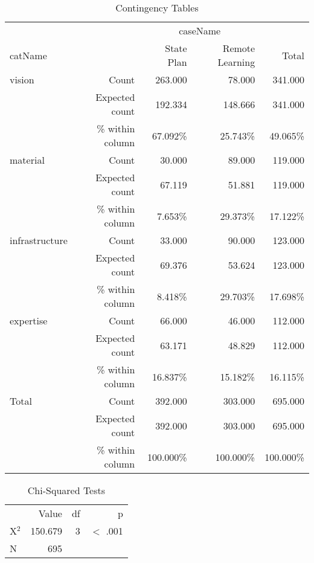 \documentclass[6pt, oneside]{article}   	%
\begin{document}


\begin{table}[h]
	\centering
	\caption{Contingency Tables}
	\label{tab:contingencyTables}
	{
		\begin{tabular}{lrrrr}
			\toprule
			\multicolumn{1}{c}{} & \multicolumn{1}{c}{} & \multicolumn{2}{c}{caseName} & \multicolumn{1}{c}{} \\
			\cline{3-4}
			catName &  & State Plan & Remote Learning & Total  \\
			\cmidrule[0.4pt]{1-5}
			vision & Count & 263.000 & 78.000 & 341.000  \\
			 & Expected count & 192.334 & 148.666 & 341.000  \\
			 &  \% within column & 67.092\% & 25.743\% & 49.065\%  \\
			material & Count & 30.000 & 89.000 & 119.000  \\
			 & Expected count & 67.119 & 51.881 & 119.000  \\
			 &  \% within column & 7.653\% & 29.373\% & 17.122\%  \\
			infrastructure & Count & 33.000 & 90.000 & 123.000  \\
			 & Expected count & 69.376 & 53.624 & 123.000  \\
			 &  \% within column & 8.418\% & 29.703\% & 17.698\%  \\
			expertise & Count & 66.000 & 46.000 & 112.000  \\
			 & Expected count & 63.171 & 48.829 & 112.000  \\
			 &  \% within column & 16.837\% & 15.182\% & 16.115\%  \\
			Total & Count & 392.000 & 303.000 & 695.000  \\
			 & Expected count & 392.000 & 303.000 & 695.000  \\
			 &  \% within column & 100.000\% & 100.000\% & 100.000\%  \\
			\bottomrule
		\end{tabular}
	}
\end{table}



\begin{table}[h]
	\centering
	\caption{Chi-Squared Tests}
	\label{tab:chi-SquaredTests}
	{
		\begin{tabular}{lrrr}
			\toprule
			 & Value & df & p  \\
			\cmidrule[0.4pt]{1-4}
			X$^{2}$ & 150.679 & 3 & $<$ .001  \\
			N & 695 &  &    \\
			\bottomrule
		\end{tabular}
	}
\end{table}
\end{document}
